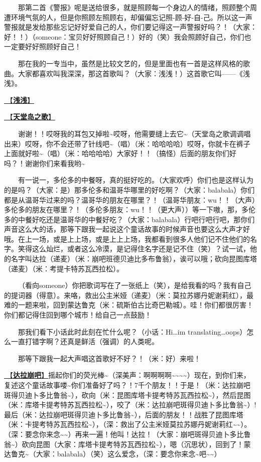 \documentclass[]{ctexbook}
\begin{document}
  那第二首《警报》呢是送给很多，就是照顾每一个身边人的情绪，照顾整个周遭环境气氛的人，但是你照顾左照顾右，却偏偏忘记照-顾-好-自-己。所以这一声警报就是发给那些忘记好好爱自己的人，你们要记得这一声警报好吗？！（大家：好！！）（someone：宝贝好好照顾自己！）好的（笑）我会照顾好自己，你们也一定要好好照顾好自己！

  那在我的一专当中，虽然是比较文艺的，但是里面也有一首是这样风格的歌曲。大家都喜欢叫我深深，那这首歌叫？（大家：浅浅！）这首歌它叫------《浅浅》。

\hyperref[qianqian]{🎵【\textbf{浅浅}】}

\hyperref[haven-song]{🎵【\textbf{天堂岛之歌}】}

  谢谢！！哎呀我的耳包又掉啦\textasciitilde 哎呀，他需要缝上去它\textasciitilde（天堂岛之歌调调唱出来）哎呀，你不会还带了针线吧\textasciitilde（唱）（米：哈哈哈哈）哎呀，你就卡在裤子上面就好啦\textasciitilde（唱）（米：哈哈哈哈）大家好！！（搞怪）后面的朋友你们好吗？！谢谢你们来看我哟\textasciitilde{}

  有一说一，多伦多的中餐呀，真的挺好吃的。（大家欢呼）你们也是这样认为的是吗？（大家：是）那多伦多和温哥华哪里的好吃啊？（大家：balabala）你们都是从温哥华过来的吗？温哥华的朋友在哪里？！（温哥华朋友：wu！！（大声）多伦多的朋友在哪里？！（多伦多朋友：wu！！（更大声））等一下嗷，那，多伦多的中餐好吃还是温哥华的中餐好吃？（大家：balabala）行吧行吧行吧，那你们声音这么大的话，那等下跟我一起说这个童话故事的时候声音也要这么大声才好哦。在上一场，或是上上场，或是上上上场，我都看到很多人他们记不住他们的名字。笑得这么灿烂，或者这么冷漠，是记得住名字还是记不住（笑）？试一试，他的名字叫达拉（递麦）（米：崩吧班德贝迪比多布鲁翁），诶可以哦；砍向昆图库塔（递麦）（米：考提卡特苏瓦西拉松）。

  （看向someone）你把歌词写在了一张纸上（笑），是给我看的吗？我有自己的提词器（得意）。来咯，救出公主米娅（递麦）（米：莫拉苏娜丹妮谢莉红），最难的一题来啦，回到蒙达鲁克（米：硫斯伯古比奇巴勒城）。哇！你们都很厉害！你们都记得住回到哪个城市！给自己一点鼓励！

  那我们看下小话此时此刻在忙什么呢？（小话：Hi\ldots im translating\ldots oops）怎么一直打错字啊？还真是鲜活（强调）的人类呢。

  那等下跟我一起大声唱这首歌好不好？！（米：好）来啦！

\hyperref[dalabengba]{🎵【\textbf{达拉崩吧}】}摇起你们的荧光棒\textasciitilde（深美声：啊啊啊啊\textasciitilde\textasciitilde\textasciitilde\textasciitilde）现在，到你们来，复述这个童话故事喽\textasciitilde 你们准备好了吗？！7千个朋友！！于是！（米：达拉崩吧斑得贝迪卜多比鲁翁\textasciitilde），砍向（米：昆图库塔卡提考特苏瓦西拉松\textasciitilde），然后昆图（米：库塔卡提考特苏瓦西拉松\textasciitilde），咬了（米：达拉崩吧斑得贝迪卜多比鲁翁\textasciitilde）!最后（米：达拉崩吧斑得贝迪卜多比鲁翁\textasciitilde），后面的朋友！！战胜了昆图库塔（米：卡提考特苏瓦西拉松\textasciitilde），（深：救出了公主米娅莫拉苏娜丹妮谢莉红\textasciitilde\textasciitilde）。（深：要念你来念\textasciitilde\textasciitilde）再来一遍！他叫！达拉！（大家：崩吧斑得贝迪卜多比鲁翁\textasciitilde）砍向昆图（大家：库塔卡提考特苏瓦西拉松\textasciitilde），嗯（沉思状），回到了！蒙达鲁克\textasciitilde（大家：balabala）（笑）这么爱念，（深：要念你来念\textasciitilde 吧\textasciitilde\textasciitilde）
\end{document}
